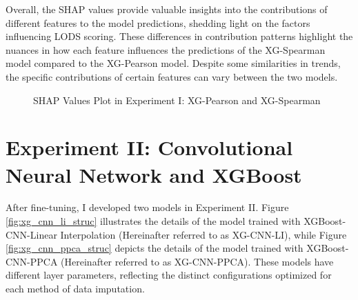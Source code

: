 \documentclass[12pt,a4paper,english
]{tunithesis}
\begin{document}
Overall, the SHAP values provide valuable insights into the contributions of different features to the model predictions, shedding light on the factors influencing LODS scoring. These differences in contribution patterns highlight the nuances in how each feature influences the predictions of the XG-Spearman model compared to the XG-Pearson model. Despite some similarities in trends, the specific contributions of certain features can vary between the two models.


\begin{figure}
  \begin{center}
    \qquad                        
    \caption[SHAP values in Experiment I]{SHAP Values Plot in Experiment I: XG-Pearson and XG-Spearman}    
    \label{fig:experiment_1_shap}
  \end{center}
\end{figure}


\section{Experiment II: Convolutional Neural Network and XGBoost}

After fine-tuning, I developed two models in Experiment II. Figure \ref{fig:xg_cnn_li_struc} illustrates the details of the model trained with XGBoost-CNN-Linear Interpolation (Hereinafter referred to as XG-CNN-LI), while Figure \ref{fig:xg_cnn_ppca_struc} depicts the details of the model trained with XGBoost-CNN-PPCA (Hereinafter referred to as XG-CNN-PPCA). These models have different layer parameters, reflecting the distinct configurations optimized for each method of data imputation.
\end{document}
